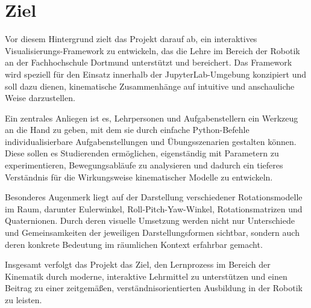 \section{Ziel}
Vor diesem Hintergrund zielt das Projekt darauf ab, ein interaktives Visualisierungs-Framework zu entwickeln, das die Lehre im Bereich der Robotik an der Fachhochschule Dortmund unterstützt und bereichert. Das Framework wird speziell für den Einsatz innerhalb der JupyterLab-Umgebung konzipiert und soll dazu dienen, kinematische Zusammenhänge auf intuitive und anschauliche Weise darzustellen.

Ein zentrales Anliegen ist es, Lehrpersonen und Aufgabenstellern ein Werkzeug an die Hand zu geben, mit dem sie durch einfache Python-Befehle individualisierbare Aufgabenstellungen und Übungsszenarien gestalten können. Diese sollen es Studierenden ermöglichen, eigenständig mit Parametern zu experimentieren, Bewegungsabläufe zu analysieren und dadurch ein tieferes Verständnis für die Wirkungsweise kinematischer Modelle zu entwickeln.

Besonderes Augenmerk liegt auf der Darstellung verschiedener Rotationsmodelle im Raum, darunter Eulerwinkel, Roll-Pitch-Yaw-Winkel, Rotationsmatrizen und Quaternionen. Durch deren visuelle Umsetzung werden nicht nur Unterschiede und Gemeinsamkeiten der jeweiligen Darstellungsformen sichtbar, sondern auch deren konkrete Bedeutung im räumlichen Kontext erfahrbar gemacht.

Insgesamt verfolgt das Projekt das Ziel, den Lernprozess im Bereich der Kinematik durch moderne, interaktive Lehrmittel zu unterstützen und einen Beitrag zu einer zeitgemäßen, verständnisorientierten Ausbildung in der Robotik zu leisten.